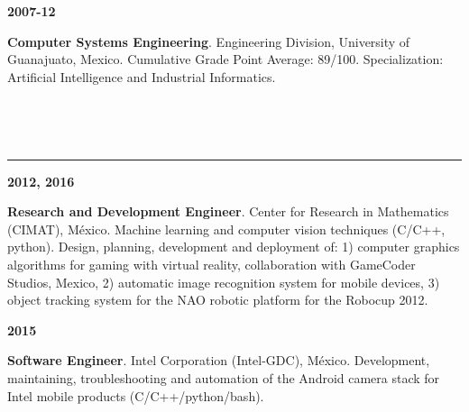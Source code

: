 \documentclass[10 pt]{article}
\newcommand{\mypartitle}[2][2.]{\vspace*{-#1 ex}~\\{\noindent {\bf #2}}}
\begin{document}
\begin{minipage}{.1\textwidth}

\vspace{-.5cm}
\hspace{-.5cm}\textbf{2007-12}

\end{minipage}\begin{minipage}{0.87\textwidth}

\textbf{Computer Systems Engineering}. Engineering Division, University of Guanajuato, 
Mexico. Cumulative Grade Point Average: 89/100. Specialization: Artificial Intelligence 
and Industrial Informatics. 

\end{minipage}\\

\medskip
\medskip

\mypartitle{Work Experience}
\medskip
\hrule
\medskip
\begin{minipage}[t][2cm]{0.1\textwidth}

\hspace{-.5cm}\textbf{2012, 2016}

\end{minipage}\begin{minipage}[t][2cm]{0.87\textwidth}

\textbf{Research and Development Engineer}. Center for Research in Mathematics (CIMAT), México. 
Machine learning and computer vision techniques (C/C++, python). 
Design, planning, development and deployment of:
1) computer graphics algorithms for gaming with virtual reality, collaboration with GameCoder Studios, Mexico,
2) automatic image recognition system for mobile devices,
3) object tracking system for the NAO robotic platform for the Robocup 2012.


\end{minipage}
\medskip

\begin{minipage}[t][1.1cm]{0.1\textwidth}

\hspace{-.5cm}\textbf{2015}

\end{minipage}\begin{minipage}[t][1.1cm]{0.87\textwidth}

\textbf{Software Engineer}. Intel Corporation (Intel-GDC), México. Development, maintaining,
troubleshooting and automation of the Android camera stack for Intel mobile products (C/C++/python/bash).

\end{minipage}
\medskip
\end{document}
